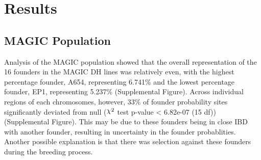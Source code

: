 \documentclass[article,9pt,twocolumn,twoside]{rilabRxiv}
\DeclareRobustCommand{\rchi}{{\mathpalette\irchi\relax}}
\newcommand{\irchi}[2]{\raisebox{\depth}{$#1\chi$}} %
\begin{document}




\section{Results}

\subsection{MAGIC Population}
Analysis of the MAGIC population showed that the overall representation of the 16 founders in the MAGIC DH lines was relatively even, with the highest percentage founder, A654, representing 6.741\% and the lowest percentage founder, EP1, representing 5.237\% (Supplemental Figure). Across individual regions of each chromosomes, however, 33\% of founder probability sites significantly deviated from null ($\rchi^2$ test p-value < 6.82e-07 (15 df)) (Supplemental Figure).
This may be due to these founders being in close IBD with another founder, resulting in uncertainty in the founder probablities. Another possible explanation is that there was selection against these founders during the breeding process.
\end{document}
